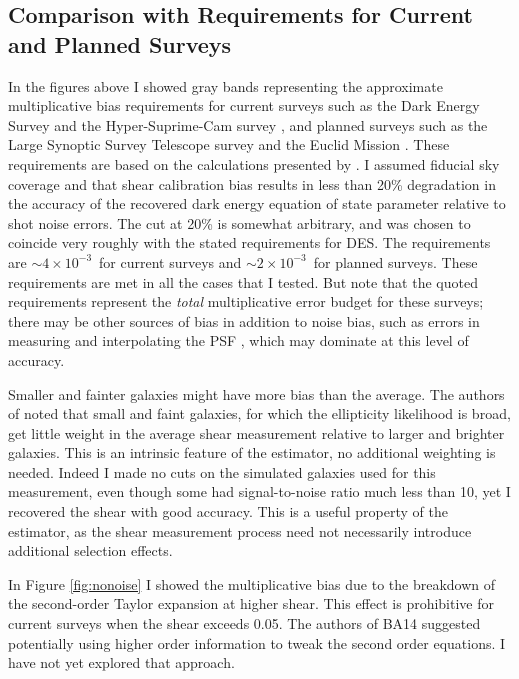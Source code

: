 \documentclass[usegraphicx,usenatbib]{mn2e}
\newcommand{\desreq}{$4\times 10^{-3}$}
\newcommand{\lsstreq}{$2\times 10^{-3}$}
\begin{document}
\subsection{Comparison with Requirements for Current and Planned Surveys}
\label{sec:req}

In the figures above I showed gray bands representing the approximate
multiplicative bias requirements for current surveys such as the Dark Energy
Survey \citep[][DES]{DESWhitePaper} and the Hyper-Suprime-Cam survey
\citep[][HSC]{HSC12}, and planned surveys such as the Large Synoptic Survey
Telescope survey \citep[][LSST]{IvezicLSST08} and the Euclid Mission
\citep{Euclid2011}.  These requirements are based on the calculations presented
by \citet{HutererSystematics06}. I assumed fiducial sky coverage and that shear
calibration bias results in less than 20\% degradation in the accuracy of the
recovered dark energy equation of state parameter relative to shot noise
errors.  The cut at 20\% is somewhat arbitrary, and was chosen to coincide very
roughly with the stated requirements for DES. The requirements are
$\sim$\desreq\ for current surveys and $\sim$\lsstreq\ for planned surveys.
These requirements are met in all the cases that I tested.  But note that the
quoted requirements represent the {\em total} multiplicative error budget for
these surveys; there may be other sources of bias in addition to noise bias,
such as errors in measuring and interpolating the PSF \citep[e.g.][]{Cropper13},
which may dominate at this level of accuracy.

Smaller and fainter galaxies might have more bias than the average.  The
authors of \cite{ba14} noted that small and faint galaxies, for which the
ellipticity likelihood is broad, get little weight in the average shear
measurement relative to larger and brighter galaxies.  This is an intrinsic
feature of the estimator, no additional weighting is needed.  Indeed I made no
cuts on the simulated galaxies used for this measurement, even though some had
signal-to-noise ratio much less than 10, yet I recovered the shear with good
accuracy.  This is a useful property of the estimator, as the shear measurement
process need not necessarily introduce additional selection effects.

In Figure \ref{fig:nonoise} I showed the multiplicative bias due to the
breakdown of the second-order Taylor expansion at higher shear.   This effect
is prohibitive for current surveys when the shear exceeds 0.05.  The authors of
BA14 suggested potentially using higher order information to tweak the second
order equations.  I have not yet explored that approach.
\end{document}
